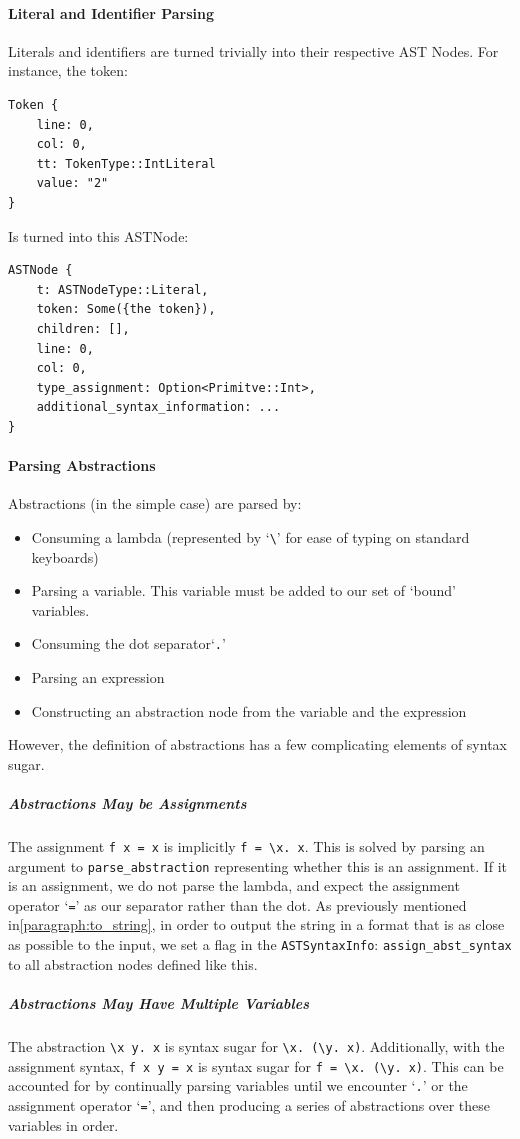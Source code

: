 \paragraph{Literal and Identifier Parsing}
Literals and identifiers are turned trivially into their respective AST Nodes. For instance, the token:
\begin{verbatim}
Token {
    line: 0,
    col: 0,
    tt: TokenType::IntLiteral
    value: "2"
}
\end{verbatim}
Is turned into this ASTNode:
\begin{verbatim}
ASTNode {
    t: ASTNodeType::Literal,
    token: Some({the token}),
    children: [],
    line: 0,
    col: 0,
    type_assignment: Option<Primitve::Int>,
    additional_syntax_information: ...
}
\end{verbatim}

\paragraph{Parsing Abstractions}
Abstractions (in the simple case) are parsed by:
\begin{itemize}
    \item Consuming a lambda (represented by `\verb|\|' for ease of typing on standard keyboards)
    \item Parsing a variable. This variable must be added to our set of `bound' variables.
    \item Consuming the dot separator`\verb|.|'
    \item Parsing an expression
    \item Constructing an abstraction node from the variable and the expression
\end{itemize}

However, the definition of abstractions has a few complicating elements of syntax sugar.

\subparagraph{Abstractions May be Assignments}
The assignment \verb|f x = x| is implicitly \verb|f = \x. x|. This is solved by parsing an argument to \verb|parse_abstraction| representing whether this is an assignment. If it is an assignment, we do not parse the lambda, and expect the assignment operator `\verb|=|' as our separator rather than the dot. As previously mentioned in\ref{paragraph:to_string}, in order to output the string in a format that is as close as possible to the input, we set a flag in the \verb|ASTSyntaxInfo|: \verb|assign_abst_syntax| to all abstraction nodes defined like this. 

\subparagraph{Abstractions May Have Multiple Variables}
The abstraction \verb|\x y. x| is syntax sugar for \newline\noindent\verb|\x. (\y. x)|. Additionally, with the assignment syntax, \verb|f x y = x| is syntax sugar for \newline\noindent\verb|f = \x. (\y. x)|. This can be accounted for by continually parsing variables until we encounter `\verb|.|' or the assignment operator `\verb|=|', and then producing a series of abstractions over these variables in order. 

